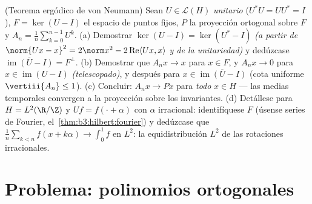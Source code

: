 \begin{exercise}[$\star\star\star$]\label{exo:b3:hilbert:12}
(Teorema ergódico de von Neumann) Sean $U \in \mathcal L(H)$
\emph{unitario} ($U^*U = UU^* = I$), $F = \ker(U - I)$ el espacio de
puntos fijos, $P$ la proyección ortogonal sobre $F$ y
$A_n = \frac1n\sum_{k=0}^{n-1}U^k$.
(a) Demostrar $\ker(U - I) = \ker(U^* - I)$ \emph{(a partir de
$\norm{Ux - x}^2 = 2\norm x^2 - 2\operatorname{Re}\langle
Ux, x\rangle$ y de la unitariedad)} y dedúzcase
$\overline{\operatorname{im}(U - I)} = F^\perp$.
(b) Demostrar que $A_nx \to x$ para $x \in F$, y $A_nx \to 0$ para
$x \in \operatorname{im}(U - I)$ \emph{(telescopado)}, y después para
$x \in \overline{\operatorname{im}(U - I)}$ (cota uniforme
$\vertiii{A_n} \leq 1$). (c) Concluir: $A_nx \to Px$ para \emph{todo}
$x \in H$ --- las medias temporales convergen a la proyección sobre los
invariantes. (d) Detállese para $H = L^2(\R/\Z)$ y $Uf = f(\cdot +
\alpha)$ con $\alpha$ irracional: identifíquese $F$ (úsense series de
Fourier, el~\cref{thm:b3:hilbert:fourier}) y dedúzcase que
$\frac1n\sum_{k<n}f(x + k\alpha) \to \int_0^1f$ en $L^2$: la
equidistribución $L^2$ de las rotaciones irracionales.
\end{exercise}

\section{Problema: polinomios ortogonales}

